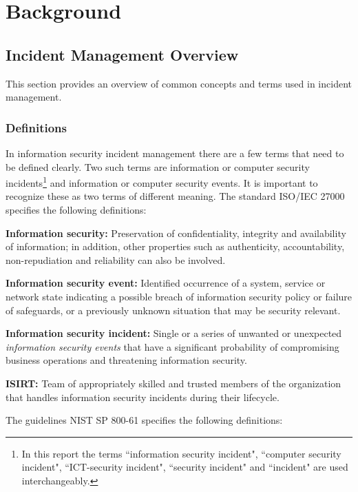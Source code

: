 \chapter{Background}
\label{chp:background}



\section{Incident Management Overview}
This section provides an overview of common concepts and terms used in incident management.
\subsection{Definitions}
\label{sec:Definitions}
In information security incident management there are a few terms that need to be defined clearly. Two such terms are information or computer security incidents\footnote{In this report the terms ``information security incident", ``computer security incident", ``ICT-security incident", ``security incident" and ``incident" are used interchangeably.} %
and information or computer security events. It is important to recognize these as two terms of different meaning. The standard \acs{ISO}/\acs{IEC} 27000 \cite{ISO/IEC27000} specifies the following definitions:

\textbf{Information security:} Preservation of confidentiality, integrity and availability of information; in addition, other properties such as authenticity, accountability, non-repudiation and reliability can also be involved.

\textbf{Information security event:} Identified occurrence of a system, service or network state indicating a possible breach of information security policy or failure of safeguards, or a previously unknown situation that may be security relevant.

\textbf{Information security incident:} Single or a series of unwanted or unexpected \emph{information security events} that have a significant probability of compromising business operations and threatening information security.

\textbf{\ac{ISIRT}:} Team of appropriately skilled and trusted members of the organization that handles information security incidents during their lifecycle.

The guidelines \acs{NIST} SP 800-61 \cite{nist800-61} specifies the following definitions:

